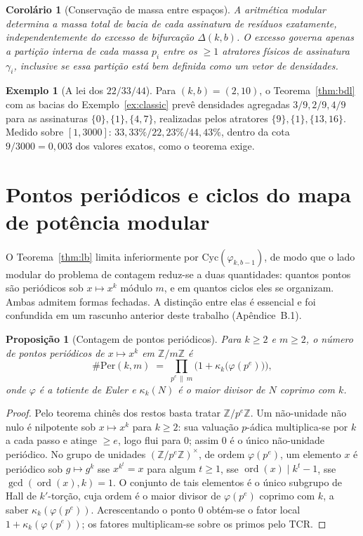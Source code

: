 \documentclass[11pt]{article}
\newtheorem{proposition}[theorem]{Proposição}
\newtheorem{corollary}[theorem]{Corolário}
\theoremstyle{definition}
\newtheorem{example}[theorem]{Exemplo}
\theoremstyle{remark}
\newcommand{\Cyc}{\mathrm{Cyc}}
\newcommand{\Per}{\mathrm{Per}}
\DeclareMathOperator{\ord}{ord}
\begin{document}
\begin{corollary}[Conservação de massa entre espaços]\label{cor:conservation}
A aritmética modular determina a massa total de bacia de cada assinatura de resíduos exatamente, independentemente do excesso de bifurcação $\Delta(k,b)$. O excesso governa apenas a partição interna de cada massa $p_i$ entre os $\ge 1$ atratores físicos de assinatura $\gamma_i$, inclusive se essa partição está bem definida como um vetor de densidades.
\end{corollary}

\begin{example}[A lei dos $22/33/44$]\label{ex:223344}
Para $(k,b) = (2,10)$, o Teorema~\ref{thm:bdl} com as bacias do Exemplo~\ref{ex:classic} prevê densidades agregadas $3/9, 2/9, 4/9$ para as assinaturas $\{0\},\{1\},\{4,7\}$, realizadas pelos atratores $\{9\},\{1\},\{13,16\}$. Medido sobre $[1,3000]$: $33{,}33\% / 22{,}23\% / 44{,}43\%$, dentro da cota $9/3000 = 0{,}003$ dos valores exatos, como o teorema exige.
\end{example}

\section{Pontos periódicos e ciclos do mapa de potência modular}\label{sec:count}

O Teorema~\ref{thm:lb} limita inferiormente por $\Cyc(\varphi_{k,b-1})$, de modo que o lado modular do problema de contagem reduz-se a duas quantidades: quantos pontos são periódicos sob $x \mapsto x^k$ módulo $m$, e em quantos ciclos eles se organizam. Ambas admitem formas fechadas. A distinção entre elas é essencial e foi confundida em um rascunho anterior deste trabalho (Apêndice~B.1).

\begin{proposition}[Contagem de pontos periódicos]\label{prop:per}
Para $k \ge 2$ e $m \ge 2$, o número de pontos periódicos de $x \mapsto x^k$ em $\mathbb{Z}/m\mathbb{Z}$ é
\[
\#\Per(k,m) \;=\; \prod_{p^{e} \,\|\, m} \Big( 1 + \kappa_k\big(\varphi(p^{e})\big) \Big),
\]
onde $\varphi$ é a totiente de Euler e $\kappa_k(N)$ é o maior divisor de $N$ coprimo com $k$.
\end{proposition}

\begin{proof}
Pelo teorema chinês dos restos basta tratar $\mathbb{Z}/p^e\mathbb{Z}$. Um não-unidade não nulo é nilpotente sob $x \mapsto x^k$ para $k \ge 2$: sua valuação $p$-ádica multiplica-se por $k$ a cada passo e atinge $\ge e$, logo flui para $0$; assim $0$ é o único não-unidade periódico. No grupo de unidades $(\mathbb{Z}/p^e\mathbb{Z})^\times$, de ordem $\varphi(p^e)$, um elemento $x$ é periódico sob $g \mapsto g^k$ sse $x^{k^t} = x$ para algum $t \ge 1$, sse $\ord(x) \mid k^t - 1$, sse $\gcd(\ord(x), k) = 1$. O conjunto de tais elementos é o único subgrupo de Hall de $k'$-torção, cuja ordem é o maior divisor de $\varphi(p^e)$ coprimo com $k$, a saber $\kappa_k(\varphi(p^e))$. Acrescentando o ponto $0$ obtém-se o fator local $1 + \kappa_k(\varphi(p^e))$; os fatores multiplicam-se sobre os primos pelo TCR.
\end{proof}
\end{document}
